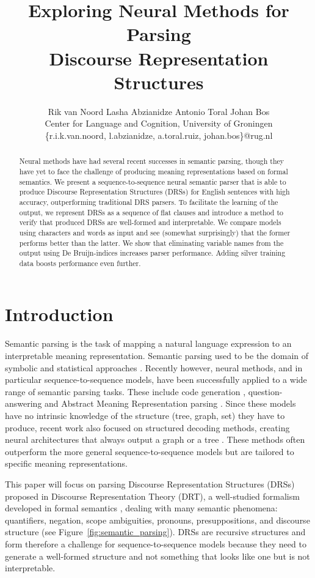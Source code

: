 \documentclass[11pt,a4paper]{article}
\title{Exploring Neural Methods for Parsing\\ Discourse Representation Structures}
\author{
 Rik van Noord \qquad Lasha Abzianidze \qquad Antonio Toral \qquad Johan Bos \\
 Center for Language and Cognition, University of Groningen \\
  {\sf \{r.i.k.van.noord, l.abzianidze, a.toral.ruiz, johan.bos\}@rug.nl} \\
}
\date{}
\begin{document}
\maketitle
\begin{abstract}
Neural methods have had several recent successes in semantic parsing, though they have yet to face the challenge of producing meaning representations based on formal semantics.
We present a sequence-to-sequence neural semantic parser that is able to produce Discourse Representation Structures (DRSs) for English sentences with high accuracy, outperforming traditional DRS parsers. To facilitate the learning of the output, we represent DRSs as a sequence of flat clauses and introduce a method to verify that produced DRSs are well-formed and interpretable.
We compare models using characters and words as input and see (somewhat surprisingly) that the former performs better than the latter. We show that eliminating variable names from the output using De Bruijn-indices
increases parser performance. 
Adding silver training data boosts performance even further.
\end{abstract}

\section{Introduction}

Semantic parsing is the task of mapping a natural language expression to an interpretable meaning representation. Semantic parsing used to be the domain of symbolic and statistical approaches \cite{pereirashieber:1987,zelle1996learning,BlackburnBos:2005}. Recently however, neural methods, and in particular sequence-to-sequence models, have been successfully applied to a wide range of semantic parsing tasks. These include code generation \cite{ling:16}, question-answering  \cite{dong-lapata:16,he2016character} and Abstract Meaning Representation parsing \cite{konstas:17}.
Since these models have no intrinsic knowledge of the structure (tree, graph, set) they have to produce, recent work also focused on structured decoding methods, creating neural architectures that always output a graph or a tree \cite{buys:17,alvarez:17}. These methods often outperform the more general sequence-to-sequence models but are tailored to specific meaning representations.

This paper will focus on parsing Discourse Representation Structures (DRSs) proposed in Discourse Representation Theory (DRT), a well-studied formalism developed in formal semantics \cite{kamp:drt,van_der_sandt:92,kampreyle:drt,asher:drt,muskens:cdrt,eijckkamp:drt,kadmon:drt,asherlascarides}, dealing with many semantic phenomena: quantifiers, negation, scope ambiguities, pronouns, presuppositions, and discourse structure (see Figure~\ref{fig:semantic_parsing}). 
DRSs are recursive structures and form therefore a challenge for sequence-to-sequence models because they need to generate a well-formed structure and not something that looks like one but is not interpretable. 
\end{document}
